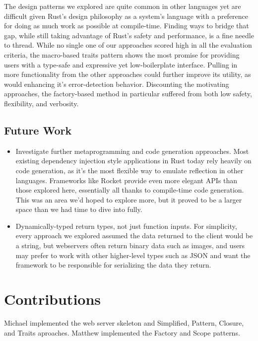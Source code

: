 \documentclass[sigconf]{acmart}
\begin{document}
 The design patterns we explored are quite common in other languages yet are difficult given Rust's design philosophy as a system's language with a preference for doing as much work as possible at compile-time. Finding ways to bridge that gap, while still taking advantage of Rust's safety and performance, is a fine needle to thread. While no single one of our approaches scored high in all the evaluation criteria, the macro-based traits pattern shows the most promise for providing users with a type-safe and expressive yet low-boilerplate interface. Pulling in more functionality from the other approaches could further improve its utility, as would enhancing it's error-detection behavior. Discounting the motivating approaches, the factory-based method in particular suffered from both low safety, flexibility, and verbosity.

\subsection{Future Work}

\begin{itemize}
\item Investigate further metaprogramming and code generation approaches. Most existing dependency injection style applications in Rust today rely heavily on code generation, as it's the most flexible way to emulate reflection in other languages. Frameworks like Rocket provide even more elegant APIs than those explored here, essentially all thanks to compile-time code generation. This was an area we'd hoped to explore more, but it proved to be a larger space than we had time to dive into fully.
\item Dynamically-typed return types, not just function inputs. For simplicity, every approach we explored assumed the data returned to the client would be a string, but webservers often return binary data such as images, and users may prefer to work with other higher-level types such as JSON and want the framework to be responsible for serializing the data they return. 
\end{itemize}

\section{Contributions}
Michael implemented the web server skeleton and Simplified, Pattern, Closure, and Traits aproaches. Matthew implemented the Factory and Scope patterns.



\end{document}
